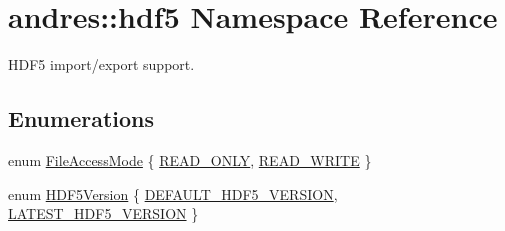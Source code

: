 \hypertarget{namespaceandres_1_1hdf5}{}\section{andres\+:\+:hdf5 Namespace Reference}
\label{namespaceandres_1_1hdf5}


H\+D\+F5 import/export support.  


\subsection*{Enumerations}
\begin{DoxyCompactItemize}
\item 
enum \hyperlink{namespaceandres_1_1hdf5_a08660935c7de0e1e76e007fc972933b9}{File\+Access\+Mode} \{ \hyperlink{namespaceandres_1_1hdf5_a08660935c7de0e1e76e007fc972933b9af05cb745b770e55c64efe88162f7e9fb}{R\+E\+A\+D\+\_\+\+O\+N\+LY}, 
\hyperlink{namespaceandres_1_1hdf5_a08660935c7de0e1e76e007fc972933b9af215ccdde9335c237c14b7c1d35766d4}{R\+E\+A\+D\+\_\+\+W\+R\+I\+TE}
 \}
\item 
enum \hyperlink{namespaceandres_1_1hdf5_ad5194a7b8773d3776e8dfc068f58f41b}{H\+D\+F5\+Version} \{ \hyperlink{namespaceandres_1_1hdf5_ad5194a7b8773d3776e8dfc068f58f41baf4fdc18c306e5d07105ad62a1cf6fa93}{D\+E\+F\+A\+U\+L\+T\+\_\+\+H\+D\+F5\+\_\+\+V\+E\+R\+S\+I\+ON}, 
\hyperlink{namespaceandres_1_1hdf5_ad5194a7b8773d3776e8dfc068f58f41ba29da3f0202bdf4ea2b036678ae7aa717}{L\+A\+T\+E\+S\+T\+\_\+\+H\+D\+F5\+\_\+\+V\+E\+R\+S\+I\+ON}
 \}
\end{DoxyCompactItemize}
